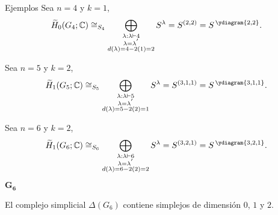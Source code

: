 \documentclass[final,xcolor=svgnames]{beamer}
\begin{document}
\begin{frame}{}
\begin{columns}
\begin{column}{0.5\textwidth}
\begin{block}{Ejemplos}
          Sea $n=4$ y $k=1$,
          \begin{equation*}
            \widetilde H_{0}(G_{4};\mathbb{C})\cong_{S_{4}}\bigoplus_{\substack{\lambda:\lambda\vdash 4\\
                \lambda=\lambda^{'}\\d(\lambda)=4-2(1)=2}} S^{\lambda}=S^{(2,2)}=S^{\,\ydiagram{2,2}}.
          \end{equation*}

          Sea $n=5$ y $k=2$,
          \begin{equation*}
            \widetilde H_{1}(G_{5};\mathbb{C})\cong_{S_{5}}\bigoplus_{\substack{\lambda:\lambda\vdash 5\\
                \lambda=\lambda^{'}\\d(\lambda)=5-2(2)=1}} S^{\lambda}=S^{(3,1,1)}=S^{\,\ydiagram{3,1,1}}.
          \end{equation*}
        
        Sea $n=6$ y $k=2$,
      \begin{equation*}
        \widetilde H_{1}(G_{6};\mathbb{C})\cong_{S_{6}}\bigoplus_{\substack{\lambda:\lambda\vdash 6\\
            \lambda=\lambda^{'}\\d(\lambda)=6-2(2)=2}} S^{\lambda}=S^{(3,2,1)}=S^{\,\ydiagram{3,2,1}}.
      \end{equation*}
    \end{block}
      
\begin{block}{}
   \begin{minipage}{0.46\linewidth} \quad
       \begin{center}

       \alert{$\boldsymbol{G_{6}}$}
     \end{center}
   \end{minipage}\qquad
   \begin{minipage}{0.46\linewidth} 
     El complejo simplicial $\Delta(G_{6})$ contiene simplejos de
     dimensión $0$, $1$ y $2$.
     

\end{minipage}
\end{block}
\end{column}
\end{columns}
\end{frame}
\end{document}
